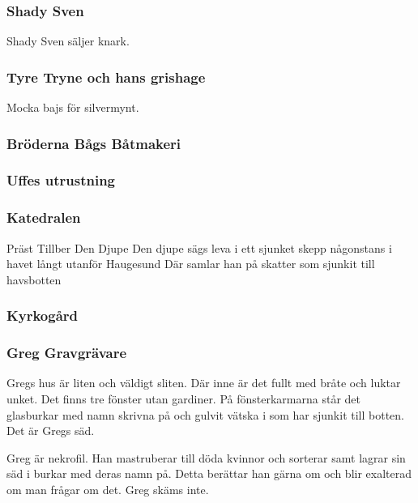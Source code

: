 \subsubsection{Shady Sven}
Shady Sven säljer knark.
%
\subsubsection{Tyre Tryne och hans grishage}
Mocka bajs för silvermynt.
%
\subsubsection{Bröderna Bågs Båtmakeri}
\label{brodernaBagsBatbryggeri}
%
\subsubsection{Uffes utrustning}
%
\subsubsection{Katedralen}
Präst
Tillber Den Djupe
Den djupe sägs leva i ett sjunket skepp någonstans i havet långt utanför Haugesund
Där samlar han på skatter som sjunkit till havsbotten
%
\subsubsection{Kyrkogård}
% 
\subsubsection{Greg Gravgrävare}
Gregs hus är liten och väldigt sliten. Där inne är det fullt med bråte och luktar unket. Det finns tre fönster utan gardiner. På fönsterkarmarna står det glasburkar med namn skrivna på och gulvit vätska i som har sjunkit till botten. Det är Gregs säd.

Greg är nekrofil. Han mastruberar till döda kvinnor och sorterar samt lagrar sin säd i burkar med deras namn på. Detta berättar han gärna om och blir exalterad om man frågar om det. Greg skäms inte.

